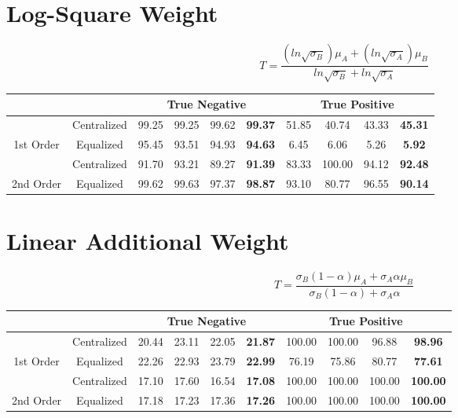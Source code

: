 \documentclass[10pt,a4paper]{article}
\begin{document}
	\section{Log-Square Weight}
		$$T = \frac{(ln\sqrt{\sigma_B})\mu_A + (ln\sqrt{\sigma_A})\mu_B}{ln\sqrt{\sigma_B} + ln\sqrt{\sigma_A}}$$
		\begin{table}[!h]
			\centering
			\begin{tabular}{|c|c|c|c|c|c|c|c|c|c|}
				\hline
				&             & \multicolumn{4}{c|}{True Negative}                            & \multicolumn{4}{c|}{True Positive}                             \\ \hline
				& Centralized & 99.25 & 99.25 & 99.62 & {\color[HTML]{FE0000} \textbf{99.37}} & 51.85 & 40.74  & 43.33 & {\color[HTML]{FE0000} \textbf{45.31}} \\ \cline{2-10} 
				\multirow{-2}{*}{1st Order} & Equalized   & 95.45 & 93.51 & 94.93 & {\color[HTML]{FE0000} \textbf{94.63}} & 6.45  & 6.06   & 5.26  & {\color[HTML]{FE0000} \textbf{5.92}}  \\ \hline
				& Centralized & 91.70 & 93.21 & 89.27 & {\color[HTML]{FE0000} \textbf{91.39}} & 83.33 & 100.00 & 94.12 & {\color[HTML]{FE0000} \textbf{92.48}} \\ \cline{2-10} 
				\multirow{-2}{*}{2nd Order} & Equalized   & 99.62 & 99.63 & 97.37 & {\color[HTML]{FE0000} \textbf{98.87}} & 93.10 & 80.77  & 96.55 & {\color[HTML]{FE0000} \textbf{90.14}} \\ \hline
			\end{tabular}
		\end{table}
		
	\section{Linear Additional Weight}
		$$T = \frac{\sigma_B (1 - \alpha) \mu_A + \sigma_A \alpha \mu_B}{\sigma_B (1 - \alpha) + \sigma_A \alpha}$$
		\begin{table}[!h]
			\centering
			\begin{tabular}{|c|c|c|c|c|c|c|c|c|c|}
				\hline
				&             & \multicolumn{4}{c|}{True Negative}                            & \multicolumn{4}{c|}{True Positive}                                \\ \hline
				& Centralized & 20.44 & 23.11 & 22.05 & {\color[HTML]{FE0000} \textbf{21.87}} & 100.00 & 100.00 & 96.88  & {\color[HTML]{FE0000} \textbf{98.96}}  \\ \cline{2-10} 
				\multirow{-2}{*}{1st Order} & Equalized   & 22.26 & 22.93 & 23.79 & {\color[HTML]{FE0000} \textbf{22.99}} & 76.19  & 75.86  & 80.77  & {\color[HTML]{FE0000} \textbf{77.61}}  \\ \hline
				& Centralized & 17.10 & 17.60 & 16.54 & {\color[HTML]{FE0000} \textbf{17.08}} & 100.00 & 100.00 & 100.00 & {\color[HTML]{FE0000} \textbf{100.00}} \\ \cline{2-10} 
				\multirow{-2}{*}{2nd Order} & Equalized   & 17.18 & 17.23 & 17.36 & {\color[HTML]{FE0000} \textbf{17.26}} & 100.00 & 100.00 & 100.00 & {\color[HTML]{FE0000} \textbf{100.00}} \\ \hline
			\end{tabular}
		\end{table}
	
\end{document}
